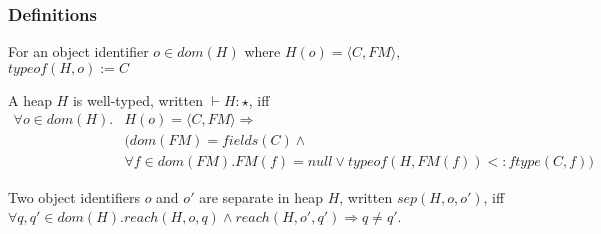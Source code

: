 \inference[]{}{}
\inference[]{}{}
\inference[]{}{}

\subsubsection{Definitions}
\begin{definition}
  For an object identifier $o \in dom(H)$ where $H(o) = \langle C, FM \rangle$, $typeof(H, o) := C$
\end{definition}

\begin{definition}
A heap $H$ is well-typed, written $\vdash H : \star$, iff
\begin{equation}
\begin{split}
  \forall o \in dom(H). & H(o) = \langle C, FM \rangle \Longrightarrow\\
                        & (dom(FM) = fields(C) \wedge\\
                        & \forall f \in dom(FM). FM(f)= null \vee typeof(H, FM(f)) <: ftype(C, f))
\end{split}
\end{equation}
\end{definition}

\begin{definition}[Separation]
  Two object identifiers $o$ and $o'$ are separate in heap $H$, written $sep(H, o, o')$, iff $\forall q, q' \in dom(H). reach(H, o, q) \wedge reach(H, o', q') \Longrightarrow q \neq q'$.
\end{definition}

